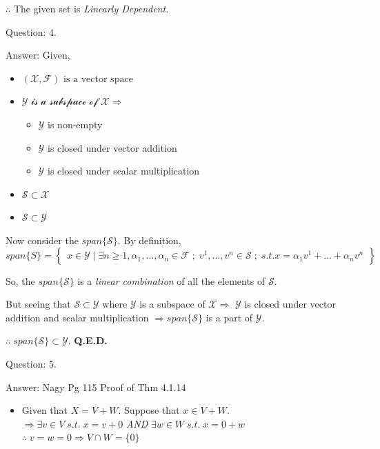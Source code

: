 \documentclass[a4paper]{article}
\begin{document}
\begin{qalist}
			$\therefore$ The given set is \textit{Linearly Dependent}.
			
		\item[Question: 4.] \setcounter{equation}{0} %
		\item[Answer:]
			Given, 
			\begin{itemize}
				\item $\mathcal{(X, F)} \text{ is a vector space}$
				\item $\mathcal{Y \text{ is a subspace of } X} \Rightarrow$
					\begin{itemize}
						\item $\mathcal{Y}$ is non-empty
						\item $\mathcal{Y}$ is closed under vector addition
						\item $\mathcal{Y}$ is closed under scalar multiplication 
					\end{itemize}
				\item $\mathcal{S \subset X}$
				\item $\mathcal{S \subset Y}$
			\end{itemize}
			
			Now consider the $span\{\mathcal{S}\}$. By definition,
			\renewcommand{\arraystretch}{1.5}
			\begin{equation}
				span\{S\} = \left\{\begin{array}{c} x \in \mathcal{Y} \;|\; \exists n \geq 1, {\alpha}_{1}, \ldots, {\alpha}_{n} \in \mathcal{F} \;;\; {v}^{1}, \ldots, {v}^{n} \in \mathcal{S}\;;\; s.t. x = {\alpha}_{1}{v}^{1} +  \ldots + {\alpha}_{n}{v}^{n}\end{array}\right\}
			\end{equation}
			
			So, the $span\{\mathcal{S}\}$ is a \textit{linear combination} of all the elements of $\mathcal{S}$. 
			
			But seeing that $\mathcal{S} \subset \mathcal{Y}$ where $\mathcal{Y}$ is a subspace of $\mathcal{X} \Rightarrow$ $\mathcal{Y}$ is closed under vector addition and scalar multiplication $\Rightarrow span\{\mathcal{S}\}$ is a part of $\mathcal{Y}$.
			
			$\therefore \; span\{\mathcal{S}\} \subset \mathcal{Y}.$ \textbf{Q.E.D.} 
		
		\newpage
		\item[Question: 5.] \setcounter{equation}{0}  %
		\item[Answer:] Nagy Pg 115 Proof of Thm 4.1.14
			\begin{itemize}[label=$\rightarrow$]
				\item Given that $X = V + W$. Suppose that $x \in V + W$. \\
					$\Rightarrow \exists v \in V \;s.t.\; x = v + 0$ \textit{AND} $\exists w \in W \;s.t.\; x = 0 + w$ \\
					$\therefore \; v = w = 0 \Rightarrow V \cap W = \{0\}$
				

\end{itemize}
\end{qalist}
\end{document}
